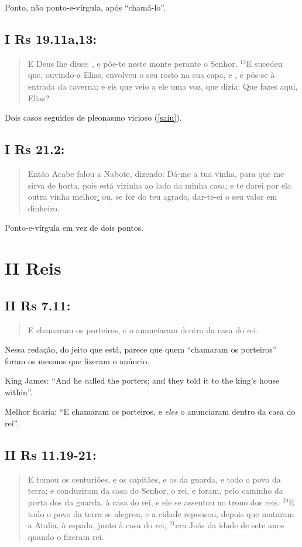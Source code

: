 Ponto, não ponto-e-vírgula, após ``chamá-lo''.

\subsection{I Rs 19.11a,13:}
\begin{quote}
    \small
E Deus lhe disse: , e põe-te neste monte perante o Senhor. $^{\mathrm{13}}$E sucedeu que, ouvindo-a Elias, envolveu o seu rosto na sua capa, e , e pôs-se à entrada da caverna; e eis que veio a ele uma voz, que dizia: Que fazes aqui, Elias?
\end{quote}

Dois casos seguidos de pleonasmo vicioso (\ref{saiu}).

\subsection{I Rs 21.2:}
\begin{quote}
    \small
Então Acabe falou a Nabote, dizendo: Dá-me a tua vinha, para que me sirva de horta, pois está vizinha ao lado da minha casa; e te darei por ela outra vinha melhor\uline{:} ou, se for do teu agrado, dar-te-ei o seu valor em dinheiro.
\end{quote}

Ponto-e-vírgula em vez de dois pontos.

\section{II Reis}
\subsection{II Rs 7.11:}
\begin{quote}
    \small
E chamaram os porteiros, e o anunciaram dentro da casa do rei.
\end{quote}

Nessa redação, do jeito que está, parece que quem ``chamaram os porteiros'' foram os mesmos que fizeram o anúncio.

King James: ``And he called the porters; and they told it to the king's house within''.

Melhor ficaria: ``E chamaram os porteiros, e \emph{eles} o anunciaram dentro da casa do rei''.

\subsection{II Rs 11.19-21:}
\begin{quote}
    \small
E tomou os centuriões, e os capitães, e os da guarda, e todo o povo da terra; e conduziram da casa do Senhor\uline{,} o rei, e foram, pelo caminho da porta dos da guarda, à casa do rei, e ele se assentou no trono dos reis. $^{\mathrm{20}}$E todo o povo da terra se alegrou, e a cidade repousou, depois que mataram a Atalia, à espada, junto à casa do rei\uline{,} $^{\mathrm{21}}$era Joás da idade de sete anos quando o fizeram rei.
\end{quote}

